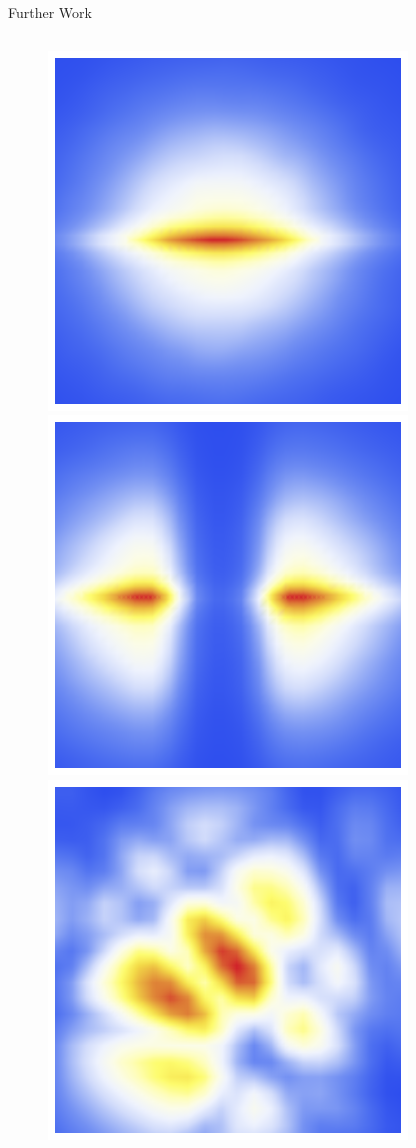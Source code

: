 \documentclass{beamer}
\begin{document}
\begin{frame}{Further Work}
\begin{minipage}[t]{\textwidth}
\begin{columns}[t]
\begin{column}{0.1\textwidth}
\begin{figure}
          \includegraphics[scale=0.1]{images/flows-2.png}

          \includegraphics[scale=0.1]{images/flows-3.png}

          \includegraphics[scale=0.1]{images/flows-4.png}
        \end{figure}
      \end{column}
    \end{columns}
  \end{minipage}
\end{frame}
\end{document}
